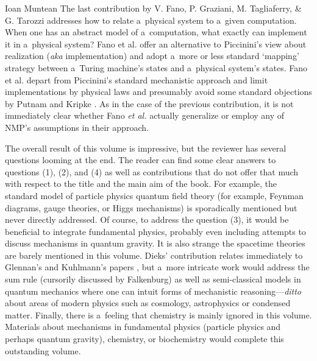 \begin{recengenv}{Ioan Muntean}
The last contribution by V. Fano, P. Graziani, M. Tagliaferry, \& G. Tarozzi addresses how to relate a~physical system to a~given computation. When one has an abstract model of a~computation, what exactly can implement it in a~physical system? Fano et al. offer an alternative to Piccinini's
\parencite*[][]{piccinini_physical_2015} %
 view about realization (\textit{aka} implementation) and adopt a~more or less standard ‘mapping' strategy between a~Turing machine's states and a~physical system's states. Fano et al. depart from Piccinini's standard mechanistic approach and limit implementations by physical laws and presumably avoid some standard objections by Putnam and Kripke 
\parencite*[][pp.217–218]{falkenburg_mechanistic_2019}. %
 As in the case of the previous contribution, it is not immediately clear whether Fano \textit{et al.} actually generalize or employ any of NMP's assumptions in their approach.

The overall result of this volume is impressive, but the reviewer has several questions looming at the end. The reader can find some clear answers to questions (1), (2), and (4) as well as contributions that do not offer that much with respect to the title and the main aim of the book. For example, the standard model of particle physics quantum field theory (for example, Feynman diagrams, gauge theories, or Higgs mechanisms) is sporadically mentioned but never directly addressed. Of course, to address the question (3), it would be beneficial to integrate fundamental physics, probably even including attempts to discuss mechanisms in quantum gravity. It is also strange the spacetime theories are barely mentioned in this volume. Dieks' contribution relates immediately to Glennan's and Kuhlmann's papers
\parencites[][]{kuhlmann_relation_2014}[][]{kuhlmann_mechanisms_2017}, %
 but a~more intricate work would address the sum rule (cursorily discussed by Falkenburg) as well as semi-classical models in quantum mechanics where one can intuit forms of mechanistic reasoning---\textit{ditto} about areas of modern physics such as cosmology, astrophysics or condensed matter. Finally, there is a~feeling that chemistry is mainly ignored in this volume. Materials about mechanisms in fundamental physics (particle physics and perhaps quantum gravity), chemistry, or biochemistry would complete this outstanding volume.


\end{recengenv}
